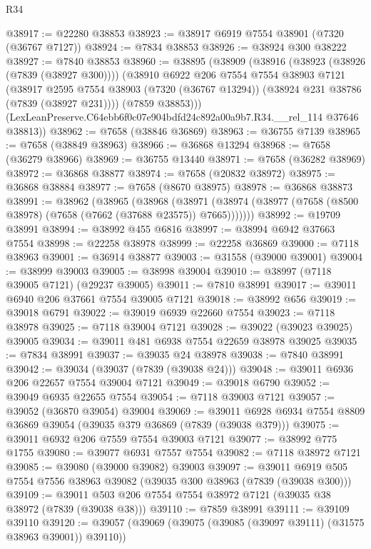 \begin{lexlean}{R34}
\begin{coremodule}
@38917 := @22280 @38853
@38923 := @38917 @6919 @7554 @38901 (@7320 (@36767 @7127))
@38924 := @7834 @38853
@38926 := @38924 @300 @38222
@38927 := @7840 @38853
@38960 := @38895
    (@38909
      (@38916
        (@38923 (@38926 (@7839 (@38927 @300))))
        (@38910
          @6922
          @206
          @7554
          @7554
          @38903
          @7121
          (@38917
            @2595
            @7554
            @38903
            (@7320 (@36767 @13294))
            (@38924 @231 @38786 (@7839 (@38927 @231))))
          (@7859 @38853)))
      (LexLeanPreserve.C64ebb6f0c07e904bdfd24c892a00a9b7.R34.__rel_114 @37646 @38813))
@38962 := @7658 (@38846 @36869)
@38963 := @36755 @7139
@38965 := @7658 (@38849 @38963)
@38966 := @36868 @13294
@38968 := @7658 (@36279 @38966)
@38969 := @36755 @13440
@38971 := @7658 (@36282 @38969)
@38972 := @36868 @38877
@38974 := @7658 (@20832 @38972)
@38975 := @36868 @38884
@38977 := @7658 (@8670 @38975)
@38978 := @36868 @38873
@38991 := @38962
    (@38965
      (@38968
        (@38971 (@38974 (@38977 (@7658 (@8500 @38978) (@7658 (@7662 (@37688 @23575)) @7665)))))))
@38992 := @19709 @38991
@38994 := @38992 @455 @6816
@38997 := @38994 @6942 @37663 @7554
@38998 := @22258 @38978
@38999 := @22258 @36869
@39000 := @7118 @38963
@39001 := @36914 @38877
@39003 := @31558 (@39000 @39001)
@39004 := @38999 @39003
@39005 := @38998 @39004
@39010 := @38997 (@7118 @39005 @7121) (@29237 @39005)
@39011 := @7810 @38991
@39017 := @39011 @6940 @206 @37661 @7554 @39005 @7121
@39018 := @38992 @656
@39019 := @39018 @6791
@39022 := @39019 @6939 @22660 @7554
@39023 := @7118 @38978
@39025 := @7118 @39004 @7121
@39028 := @39022 (@39023 @39025) @39005
@39034 := @39011 @481 @6938 @7554 @22659 @38978 @39025
@39035 := @7834 @38991
@39037 := @39035 @24 @38978
@39038 := @7840 @38991
@39042 := @39034 (@39037 (@7839 (@39038 @24)))
@39048 := @39011 @6936 @206 @22657 @7554 @39004 @7121
@39049 := @39018 @6790
@39052 := @39049 @6935 @22655 @7554
@39054 := @7118 @39003 @7121
@39057 := @39052 (@36870 @39054) @39004
@39069 := @39011 @6928 @6934 @7554 @8809 @36869 @39054 (@39035 @379 @36869 (@7839 (@39038 @379)))
@39075 := @39011 @6932 @206 @7559 @7554 @39003 @7121
@39077 := @38992 @775 @1755
@39080 := @39077 @6931 @7557 @7554
@39082 := @7118 @38972 @7121
@39085 := @39080 (@39000 @39082) @39003
@39097 := @39011 @6919 @505 @7554 @7556 @38963 @39082 (@39035 @300 @38963 (@7839 (@39038 @300)))
@39109 := @39011 @503 @206 @7554 @7554 @38972 @7121 (@39035 @38 @38972 (@7839 (@39038 @38)))
@39110 := @7859 @38991
@39111 := @39109 @39110
@39120 := @39057 (@39069 (@39075 (@39085 (@39097 @39111) (@31575 @38963 @39001)) @39110))

\end{coremodule}
\end{lexlean}
